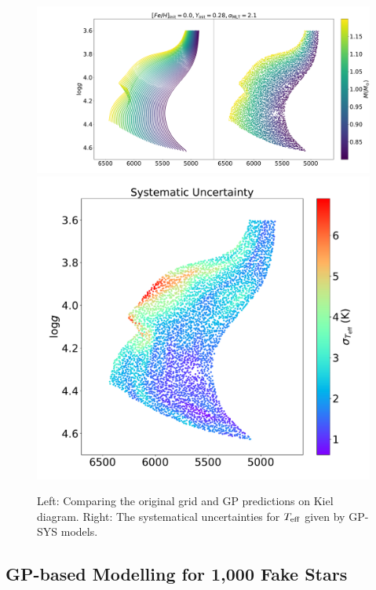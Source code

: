 \begin{figure}
	\includegraphics[width=1.3\columnwidth]{5d-au-mass.pdf}
	\includegraphics[width=0.7\columnwidth]{5d-au-mass-sys.pdf}
    \caption{ Left: Comparing the original grid and GP predictions on Kiel diagram. Right: The systematical uncertainties for $T_{\rm eff}$ given by GP-SYS models.} 
  \label{fig:5d_augmentation}
\end{figure}


\subsection{GP-based Modelling for 1,000 Fake Stars}


